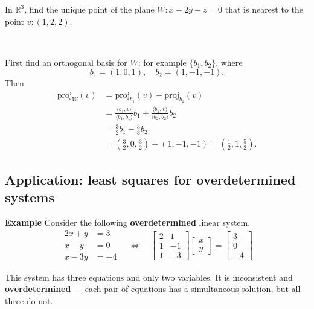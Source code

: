 \documentclass[a4paper, 9pt]{extarticle}
\begin{document}
\begin{examplebox}
  In $\mathbb{R}^3$, find the unique point of the plane $W : x + 2y - z = 0$
  that is nearest to the point $v : (1, 2, 2)$.
  \\ \rule{\textwidth}{1pt}\\
  First find an orthogonal basis for $W$: for example $\{b_1, b_2\}$, where
  $$
    b_1 = (1, 0, 1), \quad b_2 = (1, -1, -1).
  $$
  Then
  \begin{align*}
    \text{proj}_W(v) & = \text{proj}_{b_1}(v) + \text{proj}_{b_2}(v)                                                                               \\
                     & = \frac{\langle b_1, v \rangle}{\langle b_1, b_1 \rangle} b_1 + \frac{\langle b_2, v \rangle}{\langle b_2, b_2 \rangle} b_2 \\
                     & = \frac{3}{2} b_1 - \frac{3}{3} b_2                                                                                         \\
                     & = \left( \frac{3}{2}, 0, \frac{3}{2} \right) - (1, -1, -1) = \left( \frac{1}{2}, 1, \frac{5}{2} \right).
  \end{align*}
\end{examplebox}
\subsection{Application: least squares for overdetermined systems}
\textbf{Example} Consider the following \textbf{overdetermined} linear system.
$$
  \begin{aligned}
    2x + y & = 3  \\
    x - y  & = 0  \\
    x - 3y & = -4
  \end{aligned}
  \quad \Longleftrightarrow \quad
  \begin{bmatrix}
    2 & 1  \\
    1 & -1 \\
    1 & -3
  \end{bmatrix}
  \begin{bmatrix}
    x \\
    y
  \end{bmatrix}
  =
  \begin{bmatrix}
    3 \\
    0 \\
    -4
  \end{bmatrix}
$$

This system has three equations and only two variables. It is inconsistent and \textbf{overdetermined} — each pair of equations has a simultaneous solution, but all three do not.
\end{document}
